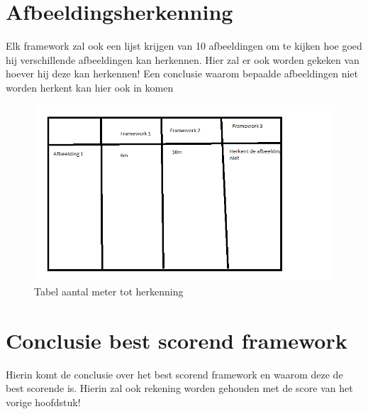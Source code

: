 \section{Afbeeldingsherkenning}
Elk framework zal ook een lijst krijgen van 10 afbeeldingen om te kijken hoe goed hij verschillende afbeeldingen kan herkennen. Hier zal er ook worden gekeken van hoever hij deze kan herkennen!
Een conclusie waarom bepaalde afbeeldingen niet worden herkent kan hier ook in komen
\begin{figure}
    \includegraphics[width=\textwidth]{img/imgrex}\caption{Tabel aantal meter tot herkenning}\label{fig:imgrex}
\end{figure}
\section{Conclusie best scorend framework}
Hierin komt de conclusie over het best scorend framework en waarom deze de best scorende is. Hierin zal ook rekening worden gehouden met de score van het vorige hoofdstuk!